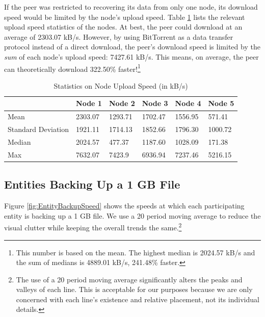 \documentclass[12pt]{report}
\begin{document}

If the peer was restricted to recovering its data from only one node, its download speed would be limited by the node's upload speed. Table \ref{tab:NodeRecoverySpeed} lists the relevant upload speed statistics of the nodes. At best, the peer could download at an average of 2303.07 kB/s. However, by using BitTorrent as a data transfer protocol instead of a direct download, the peer's download speed is limited by the \textit{sum} of each node's upload speed: 7427.61 kB/s. This means, on average, the peer can theoretically download 322.50\% faster!\footnote{This number is based on the mean. The highest median is 2024.57 kB/s and the sum of medians is 4889.01 kB/s, 241.48\% faster.}

\begin{table}
\begin{center}
    \begin{tabular}{| l | l | l | l | l | l |}
    \hline
    & Node 1 & Node 2 & Node 3 & Node 4 & Node 5 \\ \hline
    Mean & 2303.07 & 1293.71 & 1702.47 & 1556.95 & 571.41 \\ \hline
    Standard Deviation & 1921.11 & 1714.13 & 1852.66 & 1796.30 & 1000.72 \\ \hline
    Median & 2024.57 & 477.37 & 1187.60 & 1028.09 & 171.38 \\ \hline
    Max & 7632.07 & 7423.9 & 6936.94 & 7237.46 & 5216.15 \\ \hline
    \end{tabular}
    \caption{Statistics on Node Upload Speed (in kB/s)}
    \label{tab:NodeRecoverySpeed}
\end{center}
\end{table}

\subsection{Entities Backing Up a 1 GB File}

Figure \ref{fig:EntityBackupSpeed} shows the speeds at which each participating entity is backing up a 1 GB file.  We use a 20 period moving average to reduce the visual clutter while keeping the overall trends the same.\footnote{The use of a 20 period moving average significantly alters the peaks and valleys of each line. This is acceptable for our purposes because we are only concerned with each line's existence and relative placement, not its individual details.}
\end{document}
